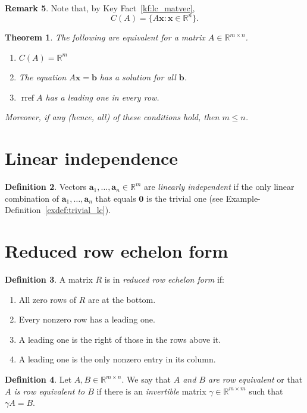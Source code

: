 \documentclass[12pt]{amsart}
\newcommand{\RR}{\mathbb{R}}
\DeclareMathOperator{\rref}{rref}
\newtheorem{theorem}{Theorem}[section]
\theoremstyle{definition} \newtheorem{definition}[theorem]{Definition}
\newtheorem{remark}[theorem]{Remark} \newtheorem{remarks}[theorem]{Remarks}
\newcommand{\ba}{\mathbf{a}}
\newcommand{\bb}{\mathbf{b}}
\newcommand{\bx}{\mathbf{x}}
\newcommand{\bzero}{\mathbf{0}}
\newcommand{\bas}{\ba_1,\ldots,\ba_n}
\begin{document}
\begin{remark}
Note that, by Key Fact~\ref{kf:lc_matvec}, \[ C(A) = \{A\bx : \bx\in\RR^n\}.
\] \begin{theorem} The following are equivalent for a matrix $A\in\RR^{m\times
n}$.  \begin{enumerate} \item $C(A) = \RR^m$ \item The equation $A\bx=\bb$ has
	a solution for all $\bb$.  \item $\rref A$ has a leading one in every
	row.  \end{enumerate} Moreover, if any (hence, all) of these conditions
hold, then $m\leq n$.  \end{theorem}


\section{Linear independence}

\begin{definition} Vectors $\bas\in\RR^m$ are \emph{linearly independent} if
the only linear combination of $\bas$ that equals $\bzero$ is the trivial one
(see Example-Definition~\ref{exdef:trivial_lc}).  \end{definition}


\section{Reduced row echelon form}


\begin{definition}\label{df:rref}
  A matrix $R$ is in \emph{reduced row echelon form} if:
  \begin{enumerate}
    \item All zero rows of $R$ are at the bottom.
    \item Every nonzero row has a leading one.
    \item A	leading one is the right of those in the rows above it.
    \item A leading one is the only nonzero entry in its column.
  \end{enumerate}
\end{definition}

\begin{definition}\label{df:row_equiv}
  Let $A, B\in \RR^{m\times n}$.
  We say that \emph{$A$ and $B$ are row equivalent} or that \emph{$A$ is row equivalent to $B$} if there is an \emph{invertible} matrix $\gamma\in\RR^{m\times m}$ such that $\gamma A=B$.
\end{definition}


\end{remark}
\end{document}
